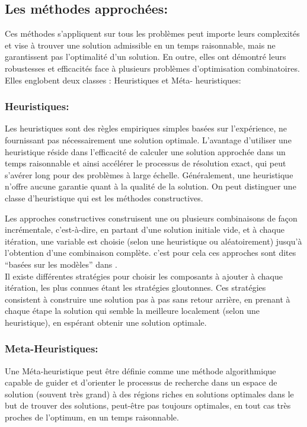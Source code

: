 \subsection{Les méthodes approchées:}
Ces méthodes s’appliquent sur tous les problèmes peut importe leurs complexités et vise à trouver une solution admissible en un temps raisonnable, mais ne garantissent pas  l’optimalité d’un solution. En outre, elles ont démontré leurs robustesses et efficacités face à plusieurs problèmes d’optimisation combinatoires. Elles englobent deux classes : Heuristiques et Méta- heuristiques:
\subsubsection{Heuristiques:}
Les heuristiques sont des règles empiriques simples basées sur l'expérience, ne fournissant pas nécessairement une solution optimale. L’avantage d’utiliser une heuristique réside dans l’efficacité de calculer une solution approchée dans un temps raisonnable et ainsi accélérer le processus de résolution exact, qui peut s’avérer long pour des problèmes à large échelle. Généralement, une heuristique n’offre aucune garantie quant à la qualité de la solution. On peut distinguer une classe d’heuristique qui est les méthodes constructives.

	Les approches constructives construisent une ou plusieurs combinaisons de façon incrémentale, c’est-à-dire, en partant d’une solution initiale vide, et à chaque itération, une variable est choisie (selon une heuristique ou aléatoirement) jusqu’à l’obtention d’une combinaison complète. c'est pour cela ces approches sont dites “basées sur les modèles” dans \cite{zlochin2004model} .\\
Il existe différentes stratégies pour choisir les composants à ajouter à chaque itération, les plus connues étant les stratégies gloutonnes. Ces stratégies consistent à construire une solution pas à pas
sans retour arrière, en prenant à chaque étape la solution qui semble la meilleure localement (selon une heuristique), en espérant obtenir une solution optimale. 

\subsubsection{Meta-Heuristiques:}
Une Méta-heuristique peut être définie comme une méthode algorithmique capable de guider et d’orienter le processus de recherche dans un espace de solution (souvent très grand) à des régions riches en solutions optimales dans le but de trouver des solutions, peut-être pas toujours optimales, en tout cas très proches de l’optimum, en un temps raisonnable.

